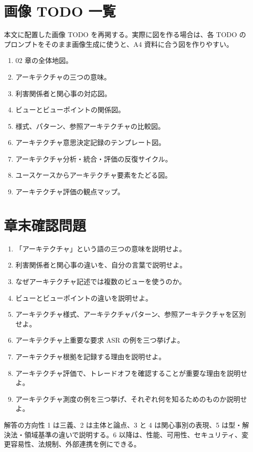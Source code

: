 \documentclass[a4paper,11pt]{ltjsarticle}
\begin{document}
\section{画像 TODO 一覧}
本文に配置した画像 TODO を再掲する。実際に図を作る場合は、各 TODO のプロンプトをそのまま画像生成に使うと、A4 資料に合う図を作りやすい。
\begin{enumerate}
  \item 02 章の全体地図。
  \item アーキテクチャの三つの意味。
  \item 利害関係者と関心事の対応図。
  \item ビューとビューポイントの関係図。
  \item 様式、パターン、参照アーキテクチャの比較図。
  \item アーキテクチャ意思決定記録のテンプレート図。
  \item アーキテクチャ分析・統合・評価の反復サイクル。
  \item ユースケースからアーキテクチャ要素をたどる図。
  \item アーキテクチャ評価の観点マップ。
\end{enumerate}

\section{章末確認問題}
\begin{enumerate}
  \item 「アーキテクチャ」という語の三つの意味を説明せよ。
  \item 利害関係者と関心事の違いを、自分の言葉で説明せよ。
  \item なぜアーキテクチャ記述では複数のビューを使うのか。
  \item ビューとビューポイントの違いを説明せよ。
  \item アーキテクチャ様式、アーキテクチャパターン、参照アーキテクチャを区別せよ。
  \item アーキテクチャ上重要な要求 ASR の例を三つ挙げよ。
  \item アーキテクチャ根拠を記録する理由を説明せよ。
  \item アーキテクチャ評価で、トレードオフを確認することが重要な理由を説明せよ。
  \item アーキテクチャ測度の例を三つ挙げ、それぞれ何を知るためのものか説明せよ。
\end{enumerate}

\begin{statementbox}{解答の方向性}
1 は三義、2 は主体と論点、3 と 4 は関心事別の表現、5 は型・解決法・領域基準の違いで説明する。6 以降は、性能、可用性、セキュリティ、変更容易性、法規制、外部連携を例にできる。
\end{statementbox}
\end{document}
